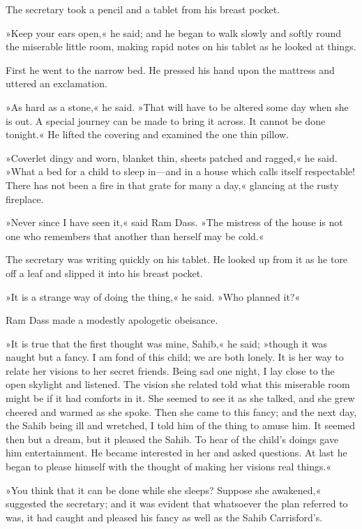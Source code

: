 The secretary took a pencil and a tablet from his breast pocket.

»Keep your ears open,« he said; and he began to walk slowly and softly round the miserable little room, making rapid notes on his tablet as he looked at things.

First he went to the narrow bed. He pressed his hand upon the mattress and uttered an exclamation.

»As hard as a stone,« he said. »That will have to be altered some day when she is out. A special journey can be made to bring it across. It cannot be done tonight.« He lifted the covering and examined the one thin pillow.

»Coverlet dingy and worn, blanket thin, sheets patched and ragged,« he said. »What a bed for a child to sleep in—and in a house which calls itself respectable! There has not been a fire in that grate for many a day,« glancing at the rusty fireplace.

»Never since I have seen it,« said Ram Dass. »The mistress of the house is not one who remembers that another than herself may be cold.«

The secretary was writing quickly on his tablet. He looked up from it as he tore off a leaf and slipped it into his breast pocket.

»It is a strange way of doing the thing,« he said. »Who planned it?«

Ram Dass made a modestly apologetic obeisance.

»It is true that the first thought was mine, Sahib,« he said; »though it was naught but a fancy. I am fond of this child; we are both lonely. It is her way to relate her visions to her secret friends. Being sad one night, I lay close to the open skylight and listened. The vision she related told what this miserable room might be if it had comforts in it. She seemed to see it as she talked, and she grew cheered and warmed as she spoke. Then she came to this fancy; and the next day, the Sahib being ill and wretched, I told him of the thing to amuse him. It seemed then but a dream, but it pleased the Sahib. To hear of the child's doings gave him entertainment. He became interested in her and asked questions. At last he began to please himself with the thought of making her visions real things.«

»You think that it can be done while she sleeps? Suppose she awakened,« suggested the secretary; and it was evident that whatsoever the plan referred to was, it had caught and pleased his fancy as well as the Sahib Carrisford's.

